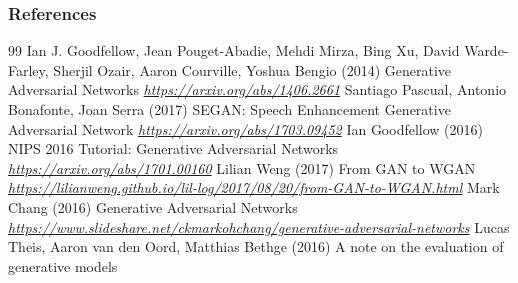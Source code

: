 \documentclass[11pt,compress,t,notes=noshow, xcolor=table]{beamer}
\begin{document}
\begin{vbframe}
\frametitle{References}
\footnotesize{
\begin{thebibliography}{99}
 Ian J. Goodfellow, Jean Pouget-Abadie, Mehdi Mirza, Bing Xu, David Warde-Farley, Sherjil Ozair, Aaron Courville, Yoshua Bengio (2014)
\newblock Generative Adversarial Networks
\newblock \emph{\url{https://arxiv.org/abs/1406.2661}}
 Santiago Pascual, Antonio Bonafonte, Joan Serra (2017)
\newblock SEGAN: Speech Enhancement Generative Adversarial Network
\newblock \emph{\url{https://arxiv.org/abs/1703.09452}}
 Ian Goodfellow (2016)
\newblock NIPS 2016 Tutorial: Generative Adversarial Networks
\newblock \emph{\url{https://arxiv.org/abs/1701.00160}}
 Lilian Weng (2017)
\newblock From GAN to WGAN
\newblock \emph{\url{https://lilianweng.github.io/lil-log/2017/08/20/from-GAN-to-WGAN.html}}
 Mark Chang (2016)
\newblock Generative Adversarial Networks
\newblock \emph{\url{https://www.slideshare.net/ckmarkohchang/generative-adversarial-networks}}
 Lucas Theis, Aaron van den Oord, Matthias Bethge (2016)
\newblock A note on the evaluation of generative models

\end{thebibliography}}
\end{vbframe}
\end{document}
